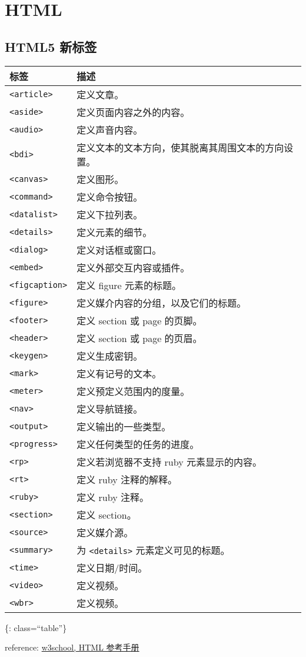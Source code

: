 \section{HTML}\label{html}

\subsection{HTML5 新标签}\label{html5-ux65b0ux6807ux7b7e}

\begin{longtable}[]{@{}ll@{}}
\toprule
标签 & 描述\tabularnewline
\midrule
\endhead
\lstinline!<article>! & 定义文章。\tabularnewline
\lstinline!<aside>! & 定义页面内容之外的内容。\tabularnewline
\lstinline!<audio>! & 定义声音内容。\tabularnewline
\lstinline!<bdi>! &
定义文本的文本方向，使其脱离其周围文本的方向设置。\tabularnewline
\lstinline!<canvas>! & 定义图形。\tabularnewline
\lstinline!<command>! & 定义命令按钮。\tabularnewline
\lstinline!<datalist>! & 定义下拉列表。\tabularnewline
\lstinline!<details>! & 定义元素的细节。\tabularnewline
\lstinline!<dialog>! & 定义对话框或窗口。\tabularnewline
\lstinline!<embed>! & 定义外部交互内容或插件。\tabularnewline
\lstinline!<figcaption>! & 定义 figure 元素的标题。\tabularnewline
\lstinline!<figure>! &
定义媒介内容的分组，以及它们的标题。\tabularnewline
\lstinline!<footer>! & 定义 section 或 page 的页脚。\tabularnewline
\lstinline!<header>! & 定义 section 或 page 的页眉。\tabularnewline
\lstinline!<keygen>! & 定义生成密钥。\tabularnewline
\lstinline!<mark>! & 定义有记号的文本。\tabularnewline
\lstinline!<meter>! & 定义预定义范围内的度量。\tabularnewline
\lstinline!<nav>! & 定义导航链接。\tabularnewline
\lstinline!<output>! & 定义输出的一些类型。\tabularnewline
\lstinline!<progress>! & 定义任何类型的任务的进度。\tabularnewline
\lstinline!<rp>! & 定义若浏览器不支持 ruby
元素显示的内容。\tabularnewline
\lstinline!<rt>! & 定义 ruby 注释的解释。\tabularnewline
\lstinline!<ruby>! & 定义 ruby 注释。\tabularnewline
\lstinline!<section>! & 定义 section。\tabularnewline
\lstinline!<source>! & 定义媒介源。\tabularnewline
\lstinline!<summary>! & 为 \lstinline!<details>!
元素定义可见的标题。\tabularnewline
\lstinline!<time>! & 定义日期/时间。\tabularnewline
\lstinline!<video>! & 定义视频。\tabularnewline
\lstinline!<wbr>! & 定义视频。\tabularnewline
\bottomrule
\end{longtable}

\{: class=``table''\}

reference: \href{http://www.w3school.com.cn/tags/index.asp}{w3school,
HTML 参考手册}


